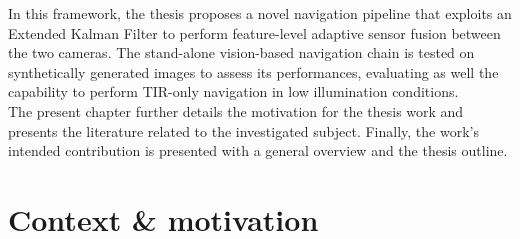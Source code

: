 In this framework, the thesis proposes a novel navigation pipeline that exploits an Extended Kalman Filter to perform feature-level adaptive sensor fusion between the two cameras. The stand-alone vision-based navigation chain is tested on synthetically generated images to assess its performances, evaluating as well the capability to perform TIR-only navigation in low illumination conditions. \\
The present chapter further details the motivation for the thesis work and presents the literature related to the investigated subject. Finally, the work's intended contribution is presented with a general overview and the thesis outline.

\section{Context \& motivation}
\label{sec:contandmotiv}
